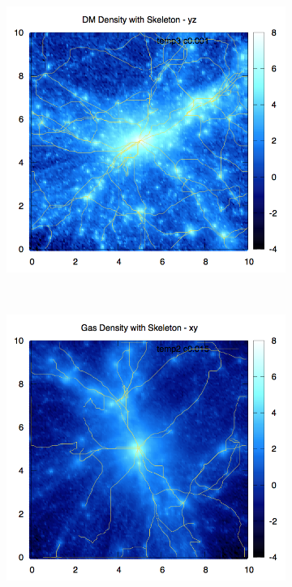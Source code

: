 \documentclass[journal]{IEEEtran}
\begin{document}
\begin{figure}[t!]
\begin{subfigure}[t]{0.3\textwidth}
	\end{subfigure}
	\quad
	\begin{subfigure}[t]{0.3\textwidth}
		\centering
		\includegraphics[width=\linewidth]{DMDenSkelyz.png}
	\end{subfigure}
	\\
	\begin{subfigure}[t]{0.3\textwidth}
		\centering
		\includegraphics[width=\linewidth]{GasDenSkelxy.png}

\end{subfigure}
\end{figure}
\end{document}
